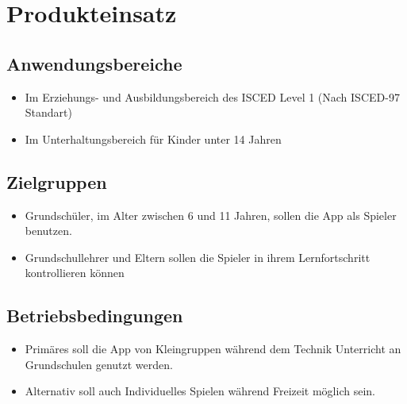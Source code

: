 \section{Produkteinsatz}

\subsection{Anwendungsbereiche}
\begin{itemize}
	\item Im Erziehungs- und Ausbildungsbereich des ISCED Level 1 (Nach ISCED-97 Standart)
	\item Im Unterhaltungsbereich für Kinder unter 14 Jahren
\end{itemize}


\subsection{Zielgruppen}

\begin{itemize}
	\item Grundschüler, im Alter zwischen 6 und 11 Jahren, sollen die App als Spieler benutzen.
	\item Grundschullehrer und Eltern sollen die Spieler in ihrem Lernfortschritt kontrollieren können
\end{itemize}

\subsection{Betriebsbedingungen}
\begin{itemize}
	\item Primäres soll die App von Kleingruppen während dem Technik Unterricht an Grundschulen genutzt werden.
	\item Alternativ soll auch Individuelles Spielen während Freizeit möglich sein.
\end{itemize}
